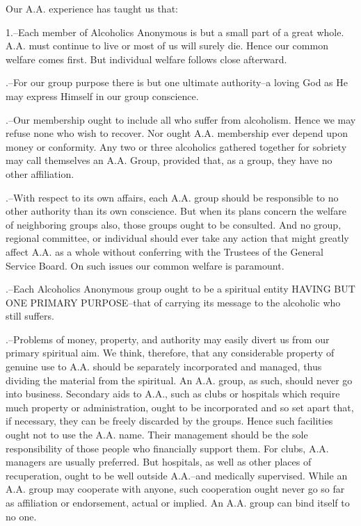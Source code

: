 \begin{biblechapter}
    Our A.A. experience has taught us that:
  
    1.--Each member of Alcoholics Anonymous 
    is but a small part of a great whole.
    A.A. must continue to live or most of us will surely die.
    Hence our common welfare comes first.
    But individual welfare follows close afterward.

.--For our group purpose there is but one ultimate authority--a 
    loving God as He may express Himself in our group conscience.

.--Our membership ought to include all who suffer from alcoholism.
    Hence we may refuse none who wish to recover.
    Nor ought A.A. membership ever depend upon money or conformity.
    Any two or three alcoholics gathered together for sobriety 
    may call themselves an A.A. Group, provided that, as a group, 
    they have no other affiliation.

.--With respect to its own affairs, 
    each A.A. group should be responsible to no other authority 
    than its own conscience.
    But when its plans concern the welfare of neighboring groups also, 
    those groups ought to be consulted.
    And no group, regional committee, or individual 
    should ever take any action that might greatly affect A.A. as a whole 
    without conferring with the Trustees of the General Service Board.
    On such issues our common welfare is paramount.

.--Each Alcoholics Anonymous group 
    ought to be a spiritual entity HAVING BUT ONE PRIMARY PURPOSE--that 
    of carrying its message to the alcoholic who still suffers.

.--Problems of money, property, and authority 
    may easily divert us from our primary spiritual aim.
    We think, therefore, 
    that any considerable property of genuine use to A.A. 
    should be separately incorporated and managed,
    thus dividing the material from the spiritual.
    An A.A. group, as such, should never go into business.
    Secondary aids to A.A., such as clubs or hospitals 
    which require much property or administration, 
    ought to be incorporated and so set apart that, if necessary, 
    they can be freely discarded by the groups.
    Hence such facilities ought not to use the A.A. name.
    Their management should be the sole responsibility 
    of those people who financially support them.
    For clubs, A.A. managers are usually preferred.
    But hospitals, as well as other places of recuperation, 
    ought to be well outside A.A.--and medically supervised.
    While an A.A. group may cooperate with anyone, 
    such cooperation ought never go so far as affiliation or endorsement, 
    actual or implied.
    An A.A. group can bind itself to no one.


\end{biblechapter}
